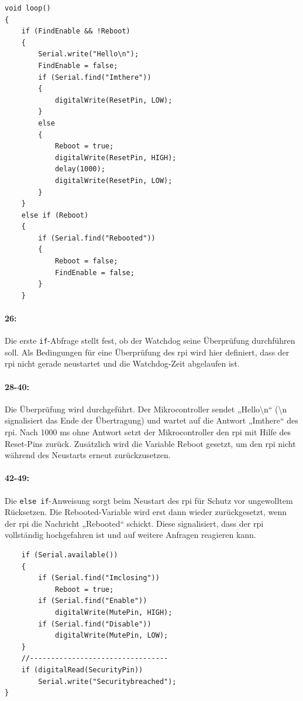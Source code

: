 \begin{verbatim}
void loop()
{
    if (FindEnable && !Reboot)
    {
        Serial.write("Hello\n");
        FindEnable = false;
        if (Serial.find("Imthere"))
        {
            digitalWrite(ResetPin, LOW);
        }
        else
        {
            Reboot = true;
            digitalWrite(ResetPin, HIGH);
            delay(1000);
            digitalWrite(ResetPin, LOW);
        }
    }
    else if (Reboot)
    {
        if (Serial.find("Rebooted"))
        {
            Reboot = false;
            FindEnable = false;
        }
    }
\end{verbatim}

\paragraph{26:}
Die erste \texttt{if}-Abfrage stellt fest, ob der Watchdog seine Überprüfung durchführen soll.
Als Bedingungen für eine Überprüfung des \ac{rpi} wird hier definiert, dass der \ac{rpi} nicht gerade neustartet und die Watchdog-Zeit abgelaufen ist.

\paragraph{28-40:}
Die Überprüfung wird durchgeführt.
Der Mikrocontroller sendet „Hello\textbackslash n“ (\textbackslash n signalisiert das Ende der Übertragung) und wartet auf die Antwort „Imthere“ des \ac{rpi}.
Nach 1000 ms ohne Antwort setzt der Mikrocontroller den \ac{rpi} mit Hilfe des Reset-Pins zurück.
Zusätzlich wird die Variable Reboot gesetzt, um den \ac{rpi} nicht während des Neustarts erneut zurückzusetzen.

\paragraph{42-49:}
Die \texttt{else if}-Anweisung sorgt beim Neustart des \ac{rpi} für Schutz vor ungewolltem Rücksetzen.
Die Rebooted-Variable wird erst dann wieder zurückgesetzt, wenn der \ac{rpi} die Nachricht „Rebooted“ schickt.
Diese signalisiert, dass der \ac{rpi} vollständig hochgefahren ist und auf weitere Anfragen reagieren kann.

\begin{verbatim}
    if (Serial.available())
    {
        if (Serial.find("Imclosing"))
            Reboot = true;
        if (Serial.find("Enable"))
            digitalWrite(MutePin, HIGH);
        if (Serial.find("Disable"))
            digitalWrite(MutePin, LOW);
    }
    //---------------------------------
    if (digitalRead(SecurityPin))
        Serial.write("Securitybreached");
}
\end{verbatim}

